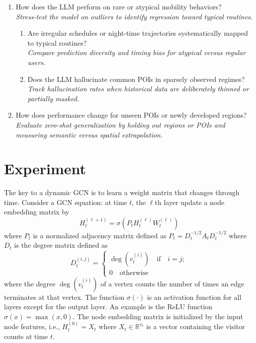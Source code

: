 \documentclass{article}
\begin{document}
\begin{enumerate}
    \item How does the LLM perform on rare or atypical mobility behaviors?\\
    \textit{Stress-test the model on outliers to identify regression toward typical routines.}
    \begin{enumerate}
        \item Are irregular schedules or night-time trajectories systematically mapped to typical routines?\\
        \textit{Compare prediction diversity and timing bias for atypical versus regular users.}
        \item Does the LLM hallucinate common POIs in sparsely observed regimes?\\
        \textit{Track hallucination rates when historical data are deliberately thinned or partially masked.}
    \end{enumerate}

    \item 
    How does performance change for unseen POIs or newly developed regions?\\
    \textit{Evaluate zero-shot generalization by holding out regions or POIs and measuring semantic versus spatial extrapolation.}
\end{enumerate}

\section{Experiment}


\noindent 
The key to a dynamic GCN is to learn a weight matrix that changes through time.
Consider a GCN equation:
at time $t$,
the $\ell$th layer 
update a node embedding matrix 
by
\[
H^{(\ell+1)}_t = \sigma(P_t H^{(\ell)}_t W^{(\ell)}_t) 
\]
where $P_t$ is a normalized adjacency matrix defined as 
$P_t = D_t^{-1/2} A_t D_t^{-1/2}$
where $D_t$ is the degree matrix 
defined as 
\[
D^{(i,j)}_t = 
\begin{cases}
    \deg (v^{(i)}_t) 
    \quad \text{if}\quad i=j;\\
    0 \quad \text{otherwise}
\end{cases}
\]
where the degree $\deg (v^{(i)}_t)$ of a vertex counts the number of times an edge terminates at that vertex. 
The function $\sigma(\cdot)$
is an activation function 
for all layers except for the output layer.
An example is the ReLU function $\sigma(x) = \max(x,0)$.
The node embedding matrix is initialized by the input node features,
i.e.,
$H^{(0)}_t = X_t$
where $X_t \in \mathbb{R}^{v_t}$
is a vector containing the visitor counts at time $t$.\\
\end{document}
